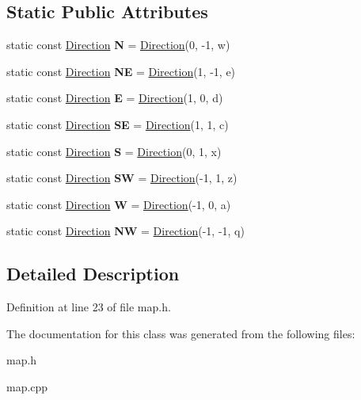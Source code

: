 \subsection*{Static Public Attributes}
\begin{DoxyCompactItemize}
\item 
\hypertarget{class_direction_a1d2dd636bd6f3aaf40fe2f34ee238d9a}{}\label{class_direction_a1d2dd636bd6f3aaf40fe2f34ee238d9a} 
static const \hyperlink{class_direction}{Direction} {\bfseries N} = \hyperlink{class_direction}{Direction}(0, -\/1, \textquotesingle{}w\textquotesingle{})
\item 
\hypertarget{class_direction_a4226b04e6a17c56966d815836fb16f23}{}\label{class_direction_a4226b04e6a17c56966d815836fb16f23} 
static const \hyperlink{class_direction}{Direction} {\bfseries NE} = \hyperlink{class_direction}{Direction}(1, -\/1, \textquotesingle{}e\textquotesingle{})
\item 
\hypertarget{class_direction_a326ea5eadf79659502fdf0059ad63921}{}\label{class_direction_a326ea5eadf79659502fdf0059ad63921} 
static const \hyperlink{class_direction}{Direction} {\bfseries E} = \hyperlink{class_direction}{Direction}(1, 0, \textquotesingle{}d\textquotesingle{})
\item 
\hypertarget{class_direction_a226e6fcf794e90dc01004c5561f16475}{}\label{class_direction_a226e6fcf794e90dc01004c5561f16475} 
static const \hyperlink{class_direction}{Direction} {\bfseries SE} = \hyperlink{class_direction}{Direction}(1, 1, \textquotesingle{}c\textquotesingle{})
\item 
\hypertarget{class_direction_af6e594fc32cf6d282a2fb5148d76fa08}{}\label{class_direction_af6e594fc32cf6d282a2fb5148d76fa08} 
static const \hyperlink{class_direction}{Direction} {\bfseries S} = \hyperlink{class_direction}{Direction}(0, 1, \textquotesingle{}x\textquotesingle{})
\item 
\hypertarget{class_direction_a99ffb02dfb1a9cd95270afcc43daecdf}{}\label{class_direction_a99ffb02dfb1a9cd95270afcc43daecdf} 
static const \hyperlink{class_direction}{Direction} {\bfseries SW} = \hyperlink{class_direction}{Direction}(-\/1, 1, \textquotesingle{}z\textquotesingle{})
\item 
\hypertarget{class_direction_a6fc63021949a997df043b8aa732fc7f0}{}\label{class_direction_a6fc63021949a997df043b8aa732fc7f0} 
static const \hyperlink{class_direction}{Direction} {\bfseries W} = \hyperlink{class_direction}{Direction}(-\/1, 0, \textquotesingle{}a\textquotesingle{})
\item 
\hypertarget{class_direction_ae934adbe5d344690218f8c9c0ccf5d35}{}\label{class_direction_ae934adbe5d344690218f8c9c0ccf5d35} 
static const \hyperlink{class_direction}{Direction} {\bfseries NW} = \hyperlink{class_direction}{Direction}(-\/1, -\/1, \textquotesingle{}q\textquotesingle{})
\end{DoxyCompactItemize}


\subsection{Detailed Description}


Definition at line 23 of file map.\+h.



The documentation for this class was generated from the following files\+:\begin{DoxyCompactItemize}
\item 
map.\+h\item 
map.\+cpp\end{DoxyCompactItemize}
